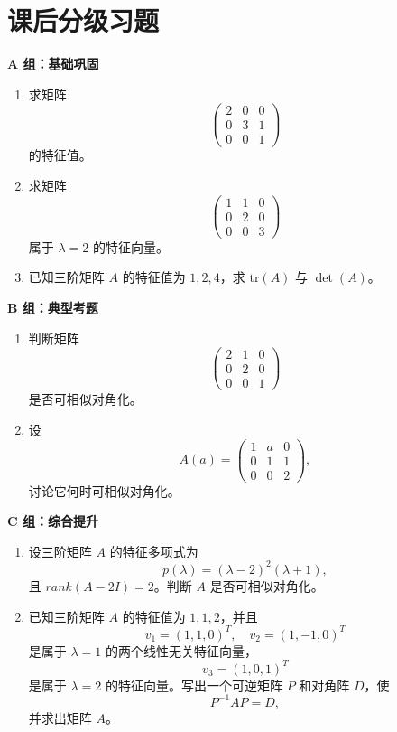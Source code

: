 \documentclass[11pt,oneside,UTF8]{ctexbook}
\begin{document}
\section{课后分级习题}

\begin{exercisebox}[第 3 章分级习题]
\textbf{A 组：基础巩固}
\begin{enumerate}[label=\textbf{A\arabic*.}]
  \item 求矩阵
  \[
  \begin{pmatrix}
  2&0&0\\
  0&3&1\\
  0&0&1
  \end{pmatrix}
  \]
  的特征值。
  \item 求矩阵
  \[
  \begin{pmatrix}
  1&1&0\\
  0&2&0\\
  0&0&3
  \end{pmatrix}
  \]
  属于 \(\lambda=2\) 的特征向量。
  \item 已知三阶矩阵 \(A\) 的特征值为 \(1,2,4\)，求 \(\mathrm{tr}(A)\) 与 \(\det(A)\)。
\end{enumerate}

\textbf{B 组：典型考题}
\begin{enumerate}[label=\textbf{B\arabic*.}]
  \item 判断矩阵
  \[
  \begin{pmatrix}
  2&1&0\\
  0&2&0\\
  0&0&1
  \end{pmatrix}
  \]
  是否可相似对角化。
  \item 设
  \[
  A(a)=
  \begin{pmatrix}
  1&a&0\\
  0&1&1\\
  0&0&2
  \end{pmatrix},
  \]
  讨论它何时可相似对角化。
\end{enumerate}

\textbf{C 组：综合提升}
\begin{enumerate}[label=\textbf{C\arabic*.}]
  \item 设三阶矩阵 \(A\) 的特征多项式为
  \[
  p(\lambda)=(\lambda-2)^2(\lambda+1),
  \]
  且 \(rank(A-2I)=2\)。判断 \(A\) 是否可相似对角化。
  \item 已知三阶矩阵 \(A\) 的特征值为 \(1,1,2\)，并且
  \[
  v_1=(1,1,0)^T,\quad v_2=(1,-1,0)^T
  \]
  是属于 \(\lambda=1\) 的两个线性无关特征向量，
  \[
  v_3=(1,0,1)^T
  \]
  是属于 \(\lambda=2\) 的特征向量。写出一个可逆矩阵 \(P\) 和对角阵 \(D\)，使
  \[
  P^{-1}AP=D,
  \]
  并求出矩阵 \(A\)。
\end{enumerate}
\end{exercisebox}
\end{document}
